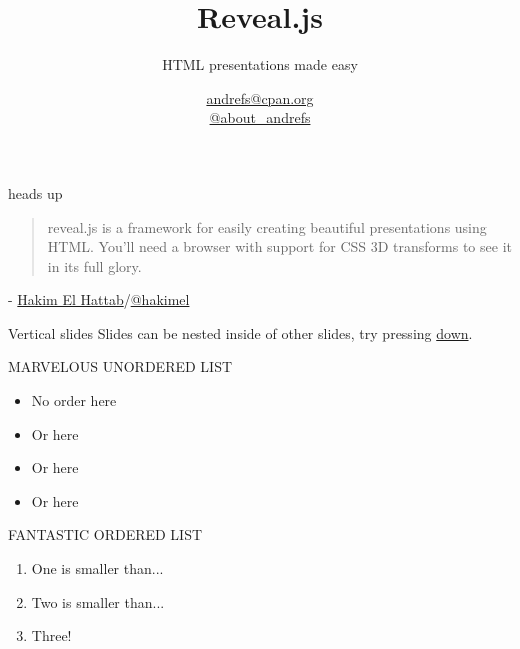 \documentclass[serif,14pt,color=usenames,dvipsnames]{beamer}
\title{Reveal.js}
\subtitle{HTML presentations made easy}
\author{\href{mailto:andrefs@cpan.org}{andrefs@cpan.org}\\\href{http://twitter.com/about\_andrefs}{@about\_andrefs}}
\institute{PtPW 2012, Braga}
\begin{document}
\begin{frame}
\maketitle
\end{frame}

\begin{frame}{heads up}
\begin{quote}
reveal.js is a framework for easily creating beautiful presentations using HTML. You'll need a browser with support for CSS 3D transforms to see it in its full glory.
\end{quote}
\begin{center}
\vspace{-0.8cm}
- \url{Hakim El Hattab}/\url{@hakimel}
\end{center}
\end{frame}

\begin{frame}{Vertical slides}
Slides can be nested inside of other slides, try pressing \href{\#}{down}.
\end{frame}

\begin{frame}{MARVELOUS UNORDERED LIST}
\begin{itemize}
\item No order here
\item Or here
\item Or here
\item Or here
\end{itemize}
\end{frame}

\begin{frame}{FANTASTIC ORDERED LIST}
\begin{enumerate}
	\item One is smaller than...
	\item Two is smaller than...
	\item Three!
\end{enumerate}
\end{frame}
\end{document}
